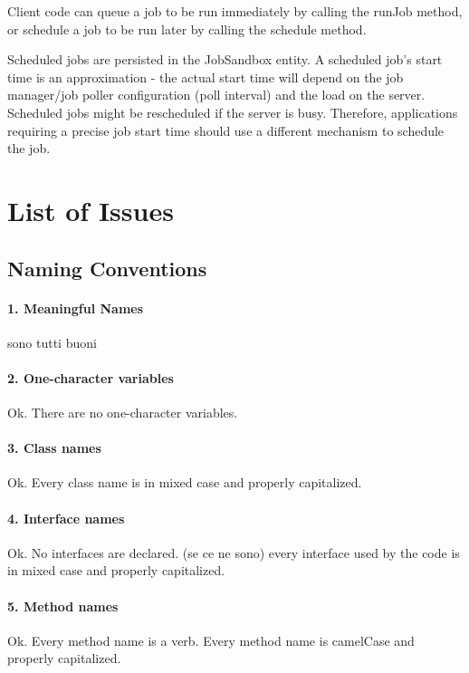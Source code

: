 \documentclass[english]{article}
\begin{document}
Client code can queue a job to be run immediately by calling the runJob method, or schedule a job to be run later by calling the schedule method. 

Scheduled jobs are persisted in the JobSandbox entity. A scheduled job's start time is an approximation - the actual start time will depend on the job manager/job poller configuration (poll interval) and the load on the server.
Scheduled jobs might be rescheduled if the server is busy. Therefore, applications requiring a precise job start time should use a different mechanism to schedule the job.

\section{List of Issues} %

\subsection{Naming Conventions}

\paragraph{1. Meaningful Names}
sono tutti buoni

\paragraph{2. One-character variables}

Ok.
There are no one-character variables.

\paragraph{3. Class names}
Ok.
Every class name is in mixed case and properly capitalized.

\paragraph{4. Interface names}
Ok.
No interfaces are declared.
(se ce ne sono) every interface used by the code is in mixed case and properly capitalized.

\paragraph{5. Method names}
Ok.
Every method name is a verb.
Every method name is camelCase and properly capitalized.
\end{document}

